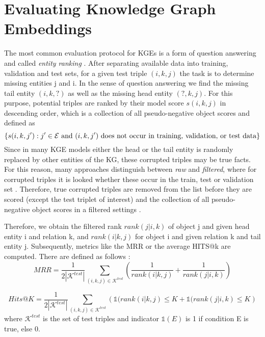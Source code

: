 \section{Evaluating Knowledge Graph Embeddings} 
\label{sec:evaluating_knowledge_graph_embeddings}

The most common evaluation protocol for \acp{KGE} is a form of question answering and called \textit{entity ranking} \cite{Ruffinelli2020You}.
After separating available data into training, validation and test sets, for a given test triple $(i,k,j)$ the task is to determine missing entities j and i.
In the sense of question answering we find the missing tail entity $(i,k,?)$ as well as the missing head entity $(?,k,j)$.
For this purpose, potential triples are ranked 
by their model score $s(i, k, j)$ in descending order, which is a collection of all pseudo-negative object scores and defined as
$$\{ s(i, k, j') : j' \in \mathcal{E} \text{ and } (i, k, j') \text{ does not occur in training, validation, or test data}\}$$
Since in many \ac{KGE} models either the head or the tail entity is randomly replaced by other entities of the \ac{KG}, these corrupted triples may be true facts.
For this reason, many approaches distinguish between \textit{raw} and \textit{filtered}, where for corrupted triples it is looked whether these occur in the train, test or validation set \cite{TransE}.
Therefore, true corrupted triples are removed from the list before they are scored (except the test triplet of interest) and the collection of all pseudo-negative object scores in a filtered settings \cite{Ruffinelli2020You}.

Therefore, we obtain the filtered rank $rank(j|i, k)$ of object j and given head entity i and relation k, and $rank(i|k, j)$ for object i and given relation k and tail entity j.
Subsequently, metrics like the \ac{MRR} or the average HITS@k are computed.
There are defined as follows \cite{Ruffinelli2020You}:
\begin{equation}
    MRR = \frac{1}{2 |\mathcal{K}^{test}|} \sum_{(i,k,j) \in  \mathcal{K}^{test}} \left( \frac{1}{rank(i |k,j)} + \frac{1}{rank(j|i,k)} \right)
\end{equation}
    
\begin{equation}
    Hits@K = \frac{1}{2|\mathcal{K}^{test}|} \sum_{(i,k,j) \in  \mathcal{K}^{test}} \left( \mathds{1} (rank(i |k,j) \leq K + \mathds{1}  (rank(j|i,k) \leq K \right)
\end{equation}
where $\mathcal{K}^{test}$ is the set of test triples and indicator $\mathds{1}(E)$ is 1 if condition E is true, else 0.



